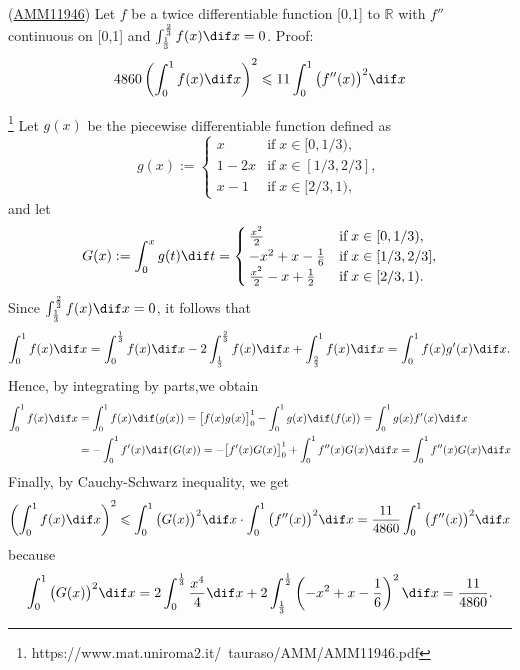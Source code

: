 \documentclass[color=green,titlestyle=hang]{elegantbook}%
\begin{document}
\begin{example}\label{exam:intneq-amm11946}
(\href{https://www.mat.uniroma2.it/~tauraso/AMM/AMM11946.pdf}{AMM11946}) %
Let $f$ be a twice differentiable function [0,1] to $\mathbb R$ with $f''$ continuous on [0,1] and $\int_{\frac{1}{3}}^{\frac{2}{3}}f(x)\dif x=0$. Proof:
\[4860\left(\int_0^1f(x)\dif x \right)^2\leqslant 11\int_0^1\big(f''(x)\big)^2\dif x \]
\end{example}\begin{solution}\footnote{https://www.mat.uniroma2.it/~tauraso/AMM/AMM11946.pdf}
Let $g(x)$ be the piecewise differentiable function defined as
\[g(x):=\begin{cases}
x   & \text{if}\; x\in[0,1/3),\\
1-2x& \text{if}\; x\in[1/3,2/3],\\
x-1 & \text{if}\; x\in[2/3,1),
\end{cases}\]
and let
\[G(x):=\int_0^xg(t)\dif t=\begin{cases}
\frac{x^2}{2}   & \text{if}\; x\in[0,1/3),\\
-x^2+x-\frac{1}{6}& \text{if}\; x\in[1/3,2/3],\\
\frac{x^2}{2}-x+\frac{1}{2}& \text{if}\; x\in[2/3,1).
\end{cases}  \]
Since $\int_{\frac{1}{3}}^{\frac{2}{3}}f(x)\dif x=0$, it follows that
\[\int_0^1 f(x)\dif x=\int_0^{\frac{1}{3}} f(x)\dif x-2\int_{\frac{1}{3}}^{\frac{2}{3}} f(x)\dif x+\int_{\frac{2}{3}}^1 f(x)\dif x=\int_0^1 f(x)g'(x)\dif x. \]
Hence, by integrating by parts,we obtain
\begin{align*}
\int_0^1 f(x)\dif x&=\int_0^1 f(x)\dif(g(x))=\big[f(x)g(x)\big]_0^1-\int_0^1 g(x)\dif(f(x))=\int_0^1 g(x)f'(x)\dif x\\
&=-\int_0^1 f'(x)\dif(G(x))=-\big[f'(x)G(x)\big]_0^1+\int_0^1 f''(x)G(x)\dif x=\int_0^1 f''(x)G(x)\dif x
\end{align*}
Finally, by Cauchy-Schwarz inequality, we get
\[\left(\int_0^1 f(x)\dif x\right)^2\leqslant \int_0^1 \big(G(x)\big)^2\dif x\cdot\int_0^1 \big(f''(x)\big)^2\dif x=\frac{11}{4860}\int_0^1 \big(f''(x)\big)^2\dif x \]
because 
\[\int_0^1 \big(G(x)\big)^2\dif x=2\int_0^{\frac{1}{3}} \frac{x^4}{4}\dif x+2\int_{\frac{1}{3}}^{\frac{1}{2}}\left(-x^2+x-\frac{1}{6}\right)^2\dif x=\frac{11}{4860}.\]
\end{solution}
\end{document}
